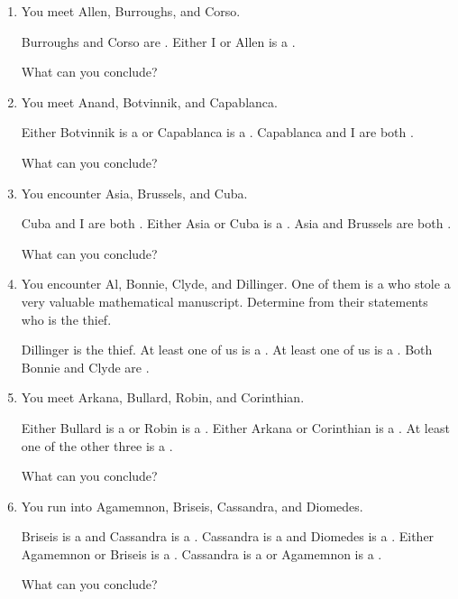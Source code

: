\probsec{~\ref{sec:conjunctions}}
\begin{enumerate}
    \item You meet Allen, Burroughs, and Corso.
  \begin{dialogue}
     Burroughs and Corso are \knights.
     Either I or Allen is a \knave.
  \end{dialogue}
  What can you conclude?

    \item You meet Anand, Botvinnik, and Capablanca.
  \begin{dialogue}
     Either Botvinnik is a \knave or Capablanca is a \knight.
     Capablanca and I are both \knaves.
  \end{dialogue}
  What can you conclude?

    \item You encounter Asia, Brussels, and Cuba.
  \begin{dialogue}
     Cuba and I are both \knights.
     Either Asia or Cuba is a \knave.
     Asia and Brussels are both \knaves.
  \end{dialogue}
  What can you conclude?

    \item You encounter Al, Bonnie, Clyde, and Dillinger. One of them is a \knave who stole a very valuable mathematical manuscript. Determine from their statements who is the thief.
  \begin{dialogue}
     Dillinger is the thief.
     At least one of us is a \knight.
     At least one of us is a \knave.
     Both Bonnie and Clyde are \knights.
  \end{dialogue}

    \item You meet Arkana, Bullard, Robin, and Corinthian.
  \begin{dialogue}
     Either Bullard is a \knight or Robin is a \knave.
     Either Arkana or Corinthian is a \knave.
     At least one of the other three is a \knave.
  \end{dialogue}
  What can you conclude?

    \item You run into Agamemnon, Briseis, Cassandra, and Diomedes.
  \begin{dialogue}
     Briseis is a \knight and Cassandra is a \knave.
     Cassandra is a \knave and Diomedes is a \knave.
     Either Agamemnon or Briseis is a \knave.
     Cassandra is a \knave or Agamemnon is a \knight.
  \end{dialogue}
  What can you conclude?


\end{enumerate}
